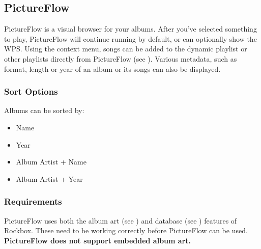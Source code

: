 \subsection{PictureFlow}
PictureFlow is a visual browser for your albums.  After you've selected something to play,
PictureFlow will continue running by default, or can optionally show the WPS. Using
the context menu, songs can be added to the dynamic playlist or other playlists directly
from PictureFlow (see ).
Various metadata, such as format, length or year of an album or its songs can also be
displayed.


\subsubsection{Sort Options}
Albums can be sorted by:

\begin{itemize}
    \item Name
    \item Year
    \item Album Artist + Name
    \item Album Artist + Year
\end{itemize}

\subsubsection{Requirements}
PictureFlow uses both the album art (see ) and
database (see ) features of Rockbox.
These need to be working correctly before PictureFlow can be used.
\textbf{PictureFlow does not support embedded album art.}




